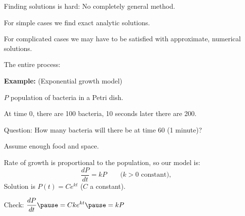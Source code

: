 \documentclass[10pt,aspectratio=169]{beamer}
\begin{document}
\begin{frame}
Finding solutions is hard: No completely general method.

\medskip
\pause

For simple cases we find exact analytic solutions.

\medskip
\pause

For complicated cases we may have to be satisfied with approximate, numerical
solutions.

\end{frame}

\begin{frame}

The entire process:

\pause
\medskip

\begin{center}
\end{center}
\end{frame}

\begin{frame}
\textbf{Example:} (Exponential growth model)

\medskip
\pause

$P$ population of bacteria in a Petri dish.

\medskip
\pause

At time 0, there are 100 bacteria, 10 seconds later there are 200.

\pause

Question: How many bacteria will there be at time 60 (1 minute)?

\medskip
\pause

Assume enough food and space.

\medskip
\pause

Rate of growth is proportional to the population, so our model is:
\pause
\[
\frac{dP}{dt} = kP \qquad \text{($k > 0$ constant)},
\]
\pause
Solution is \quad $P(t) = C e^{kt}$ \quad ($C$ a constant).

\medskip
\pause

Check: 
\quad
$\displaystyle
\frac{dP}{dt} \pause = C k e^{kt} \pause = k P$ \pause \quad {\Large\checkmark}

\end{frame}
\end{document}
